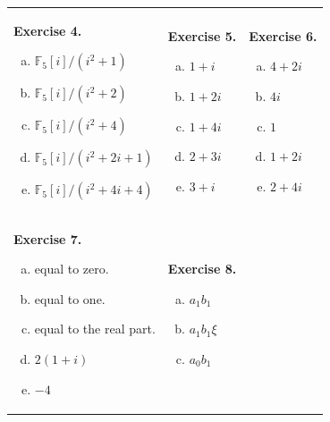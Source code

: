 \documentclass[../lecture-notes.tex]{subfiles}
\begin{document}
\begin{center}
    \begin{tabular}{p{5cm}p{5cm}p{5cm}}
        \textbf{Exercise 4.}
        \begin{enumerate}[a)]
            \item $\mathbb{F}_5[i]/(i^2+1)$
            \item $\mathbb{F}_5[i]/(i^2+2)$
            \item $\mathbb{F}_5[i]/(i^2+4)$
            \item $\mathbb{F}_5[i]/(i^2+2i+1)$
            \item $\mathbb{F}_5[i]/(i^2+4i+4)$
        \end{enumerate} &   
        \textbf{Exercise 5.}
        \begin{enumerate}[a)]
            \item $1+i$
            \item $1+2i$
            \item $1+4i$
            \item $2+3i$
            \item $3+i$
        \end{enumerate} &
        \textbf{Exercise 6.}
        \begin{enumerate}[a)]
            \item $4+2i$
            \item $4i$
            \item $1$
            \item $1+2i$
            \item $2+4i$
        \end{enumerate}
        \\
        \textbf{Exercise 7.}
        \begin{enumerate}[a)]
            \item equal to zero.
            \item equal to one.
            \item equal to the real part.
            \item $2(1+i)$
            \item $-4$
        \end{enumerate} & 
        \textbf{Exercise 8.}
        \begin{enumerate}[a)]
            \item $a_1b_1$
            \item $a_1b_1\xi$
            \item $a_0b_1$

\end{enumerate}
\end{tabular}
\end{center}
\end{document}
